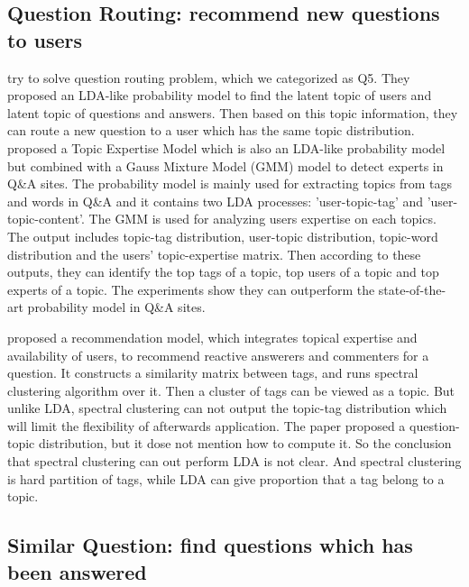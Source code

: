 \subsection{Question Routing: recommend new questions to users}

\cite{Guo:2008:TPQ:1458082.1458204} %
try to solve question routing problem, which we categorized as Q5. They proposed an LDA-like probability model to find the latent topic of users and latent topic of questions and answers. Then based on this topic information, they can route a new question to a user which has the same topic distribution.
\cite{yang2013cqarank} %
proposed a Topic Expertise Model which is also an LDA-like probability model but combined with a Gauss Mixture Model (GMM) model to detect experts in Q\&A sites. The probability model is mainly used for extracting topics from tags and words in Q\&A and it contains two LDA processes: 'user-topic-tag' and 'user-topic-content'. The GMM is used for analyzing users expertise on each topics. The output includes topic-tag distribution, user-topic distribution, topic-word distribution and the users' topic-expertise matrix. Then according to these outputs, they can identify the top tags of a topic, top users of a topic and top experts of a topic. The experiments show they can outperform the state-of-the-art probability model in Q\&A sites.


\cite{Chang:2013}
proposed a recommendation model, which integrates topical expertise and availability of users, to recommend reactive answerers and commenters for a question. It constructs a similarity matrix between tags, and runs spectral clustering algorithm over it. Then a cluster of tags can be viewed as a topic. But unlike LDA, spectral clustering can not output the topic-tag distribution which will limit the flexibility of afterwards application. The paper proposed a question-topic distribution, but it dose not mention how to compute it. So the conclusion that spectral clustering can out perform LDA is not clear. And spectral clustering is hard partition of tags, while LDA can give proportion that a tag belong to a topic. 



\subsection{Similar Question: find questions which has been answered}

